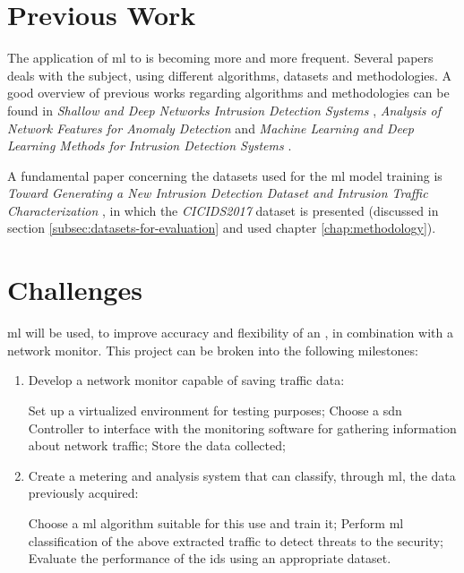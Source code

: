 
\section{Previous Work}
\label{sec:prev-work}

The application of \gls{ml} to  is becoming more and more frequent. Several papers deals with the subject, using different algorithms, datasets and methodologies. A good overview of previous works regarding algorithms and methodologies can be found in \textit{Shallow and Deep Networks Intrusion Detection Systems} \cite{Hodo2017}, \textit{Analysis of Network Features for Anomaly Detection} \cite{Iglesias2015} and \textit{Machine Learning and Deep Learning Methods for Intrusion Detection Systems} \cite{Liu2019}.
\par A fundamental paper concerning the datasets used for the \gls{ml} model training is \textit{Toward Generating a New Intrusion Detection Dataset and Intrusion Traffic Characterization} \cite{icissp17}, in which the \textit{CICIDS2017} dataset is presented (discussed in section \ref{subsec:datasets-for-evaluation} and used chapter \ref{chap:methodology}). 


\section{Challenges}
\label{sec:objectives}

\gls{ml} will be used, to improve accuracy and flexibility of an , in combination with a network monitor. This project can be broken into the following milestones:

\begin{enumerate}
    \item Develop a network monitor capable of saving traffic data:
    \begin{itemize}
        \itemAR Set up a virtualized environment for testing purposes;
        \itemAR Choose a \gls{sdn} Controller to interface with the monitoring software for gathering information about network traffic;
        \itemAR Store the data collected;
    \end{itemize}
    \item Create a metering and analysis system that can classify, through \gls{ml}, the data previously acquired:
    \begin{itemize}
        \itemAR Choose a \gls{ml} algorithm suitable for this use and train it;
        \itemAR Perform \gls{ml} classification of the above extracted traffic to detect threats to the security;
        \itemAR Evaluate the performance of the \gls{ids} using an appropriate dataset.
    \end{itemize}
\end{enumerate}

